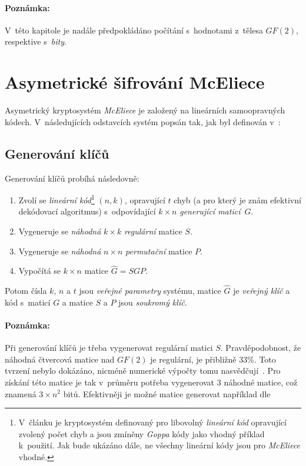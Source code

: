 \documentclass[thesis=M,czech,hidelinks]{FITthesis}[2012/06/26]
\newcommand{\0}{{\textcolor[gray]{0.80}{0}}}
\begin{document}
\paragraph{Poznámka:} V~této kapitole je nadále předpokládáno počítání
s~hodnotami z~tělesa $GF(2)$, respektive s~\emph{bity}.

\section{Asymetrické šifrování McEliece}

Asymetrický kryptosystém \emph{McEliece} je založený na lineárních samoopravných
kódech. V~následujících odstavcích systém popsán tak, jak byl definován
v~\cite{McEliece}:

\subsection{Generování klíčů}

Generování klíčů probíhá následovně:

\begin{enumerate}
    \item Zvolí se \emph{lineární kód}\footnote{
            V~článku je kryptosystém definovaný pro libovolný \emph{lineární
            kód} opravující zvolený počet chyb a jsou zmíněny \emph{Goppa} kódy
            jako vhodný příklad k~použití. Jak bude ukázáno dále, ne všechny
            lineární kódy jsou pro \emph{McEliece} vhodné.
        } $(n,k)$, opravující $t$ chyb (a pro který je znám efektivní dekódovací
        algoritmus) s~odpovídající $k \times n$ \emph{generující maticí}~$G$.
    \item Vygeneruje se \emph{náhodná} $k \times k$ \emph{regulární} matice $S$.
    \item Vygeneruje se \emph{náhodná} $n \times n$ \emph{permutační} matice $P$.
    \item Vypočítá se $k \times n$ matice $\hat{G} = S G P$.
\end{enumerate}

Potom čísla $k$, $n$ a $t$ jsou \emph{veřejné parametry} systému, matice
$\hat{G}$ je \emph{veřejný klíč} a kód s~maticí $G$ a matice $S$ a $P$ jsou
\emph{soukromý klíč}.

\paragraph{Poznámka:} Při generování klíčů je třeba vygenerovat regulární matici
$S$. Pravděpodobnost, že náhodná čtvercová matice nad $GF(2)$ je regulární, je
přibližně $33$\;\%.  Toto tvrzení nebylo dokázáno, nicméně numerické výpočty
tomu nasvědčují~\cite{Heyse}. Pro získání této matice je tak v~průměru potřeba
vygenerovat $3$ náhodné matice, což znamená $3\times n^2$ bitů. Efektivněji je
možné matice generovat například dle~\cite{Randall}
\end{document}
